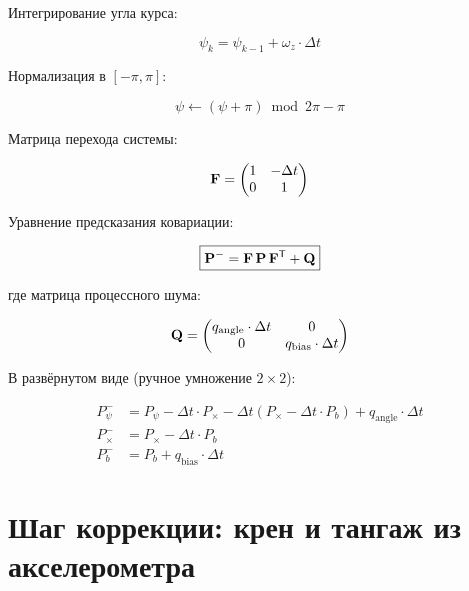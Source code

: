 Интегрирование угла курса:

\begin{equation}
  \psi_{k} = \psi_{k-1} + \omega_z \cdot \Delta t
  \label{eq:yaw_integrate}
\end{equation}

Нормализация в $[-\pi, \pi]$:

\begin{equation}
  \psi \leftarrow (\psi + \pi) \bmod 2\pi - \pi
  \label{eq:yaw_normalize}
\end{equation}

Матрица перехода системы:

\begin{equation}
  \mathbf{F} = \begin{pmatrix} 1 & -\Delta t \\ 0 & 1 \end{pmatrix}
  \label{eq:F_matrix}
\end{equation}

Уравнение предсказания ковариации:

\begin{equation}
  \boxed{\mathbf{P}^- = \mathbf{F}\,\mathbf{P}\,\mathbf{F}^{\mathsf{T}} + \mathbf{Q}}
  \label{eq:P_predict}
\end{equation}

где матрица процессного шума:

\begin{equation}
  \mathbf{Q} = \begin{pmatrix} q_{\text{angle}} \cdot \Delta t & 0 \\ 0 & q_{\text{bias}} \cdot \Delta t \end{pmatrix}
  \label{eq:Q_matrix}
\end{equation}

В развёрнутом виде (ручное умножение $2\times2$):

\begin{align}
  P_\psi^- &= P_\psi - \Delta t \cdot P_{\times}
              - \Delta t (P_{\times} - \Delta t \cdot P_b)
              + q_{\text{angle}} \cdot \Delta t \label{eq:Pyaw_pred}\\
  P_{\times}^- &= P_{\times} - \Delta t \cdot P_b \label{eq:Pcross_pred}\\
  P_b^- &= P_b + q_{\text{bias}} \cdot \Delta t \label{eq:Pbias_pred}
\end{align}

\section{Шаг коррекции: крен и тангаж из акселерометра}

